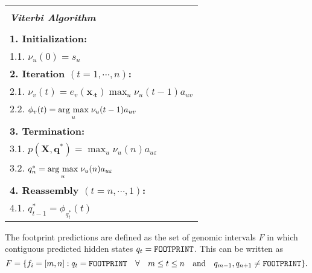 \begin{center}
  \begin{spacing}{1.0}
    \begin{tabular}{l}
      \hline \\[-0.25cm]
      \hspace{1.2cm} {\large {\bf \emph{ Viterbi Algorithm } } } \hspace{1.2cm} \\[0.1cm]
      \hline \\[-0.25cm]
      \hspace{0.2cm} {\bf 1. Initialization:} \\
      \hspace{0.9cm} 1.1. $ \nu_u(0) = s_u $ \\
      \hspace{0.2cm} {\bf 2. Iteration $ (t = 1, \cdots, n) $:} \\
      \hspace{0.9cm} 2.1. $ \nu_v(t) = e_v(\mathbf{{x}_{\cdot t}}) \max_{u} \nu_u(t-1)a_{uv} $ \\
      \hspace{0.9cm} 2.2. $ {\phi}_{v}(t) = \underset{u}{\operatorname{arg}\,\operatorname{max}}\; \nu_u(t-1) a_{uv} $ \\
      \hspace{0.2cm} {\bf 3. Termination:} \\
      \hspace{0.9cm} 3.1. $ p(\mathbf{X},\mathbf{q^*}) = \max_{u} \nu_u(n) a_{u\varepsilon} $ \\
      \hspace{0.9cm} 3.2. $ q_{n}^{\ast} = \underset{u}{\operatorname{arg}\,\operatorname{max}}\; \nu_u(n) a_{u\varepsilon} $ \\
      \hspace{0.2cm} {\bf 4. Reassembly $ (t = n, \cdots, 1) $:} \\
      \hspace{0.9cm} 4.1. $ q_{t-1}^{\ast} = {\phi}_{q_{t}^{\ast}}(t) $ \\[0.1cm]
      \hline
    \end{tabular}
  \end{spacing}
\end{center}

The footprint predictions are defined as the set of genomic intervals $F$ in which contiguous predicted hidden states $ q_t = \text{{\tt FOOTPRINT}} $. This can be written as
\begin{equation}
  \label{eq:footprint.cont}
  F = \{ f_i = [m,n] : q_t = \text{{\tt FOOTPRINT}} \quad \forall \quad m \leq t \leq n \quad \text{and} \quad q_{m-1}, q_{n+1} \neq \text{{\tt FOOTPRINT}} \}.
\end{equation}

